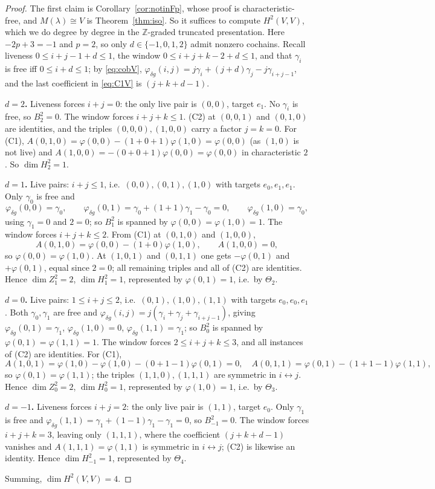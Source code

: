 \documentclass[10pt,a4paper]{amsart}
\newcommand{\Bt}{B^2}
\newcommand{\Ht}{H^2}
\newcommand{\Zt}{Z^2}
\begin{document}
\begin{proof}
The first claim is Corollary~\ref{cor:notinFp}, whose proof is characteristic-free, and
$M(\lambda)\cong V$ is Theorem~\ref{thm:iso}. So it suffices to compute $\Ht(V,V)$, which we
do degree by degree in the $\mathbb{Z}$-graded truncated presentation. Here
$-2p+3=-1$ and $p=2$, so only $d\in\{-1,0,1,2\}$ admit nonzero cochains. Recall liveness
$0\le i+j-1+d\le1$, the window $0\le i+j+k-2+d\le1$, and that $\gamma_i$ is free iff
$0\le i+d\le1$; by \eqref{eq:cobV},
$\varphi_{\delta g}(i,j)=j\gamma_i+(j+d)\gamma_j-j\gamma_{i+j-1}$, and the last coefficient
in \eqref{eq:C1V} is $(j+k+d-1)$.

\textbf{$d=2$.} Liveness forces $i+j=0$: the only live pair is $(0,0)$, target $e_1$. No
$\gamma_i$ is free, so $\Bt_2=0$. The window forces $i+j+k\le1$. (C2) at $(0,0,1)$ and
$(0,1,0)$ are identities, and the triples $(0,0,0),(1,0,0)$ carry a factor $j=k=0$. For
(C1), $A(0,1,0)=\varphi(0,0)-(1+0+1)\varphi(1,0)=\varphi(0,0)$ (as $(1,0)$ is not live) and
$A(1,0,0)=-(0+0+1)\varphi(0,0)=\varphi(0,0)$ in characteristic $2$. So $\dim\Ht_2=1$.

\textbf{$d=1$.} Live pairs: $i+j\le1$, i.e.\ $(0,0),(0,1),(1,0)$ with targets $e_0,e_1,e_1$.
Only $\gamma_0$ is free and
\[
\varphi_{\delta g}(0,0)=\gamma_0,\qquad
\varphi_{\delta g}(0,1)=\gamma_0+(1+1)\gamma_1-\gamma_0=0,\qquad
\varphi_{\delta g}(1,0)=\gamma_0,
\]
using $\gamma_1=0$ and $2=0$; so $\Bt_1$ is spanned by $\varphi(0,0)=\varphi(1,0)=1$. The
window forces $i+j+k\le2$. From (C1) at $(0,1,0)$ and $(1,0,0)$,
\[
A(0,1,0)=\varphi(0,0)-(1+0)\varphi(1,0),\qquad A(1,0,0)=0,
\]
so $\varphi(0,0)=\varphi(1,0)$. At $(1,0,1)$ and $(0,1,1)$ one gets $-\varphi(0,1)$ and
$+\varphi(0,1)$, equal since $2=0$; all remaining triples and all of (C2) are identities.
Hence $\dim\Zt_1=2$, $\dim\Ht_1=1$, represented by $\varphi(0,1)=1$, i.e.\ by $\Theta_2$.

\textbf{$d=0$.} Live pairs: $1\le i+j\le2$, i.e.\ $(0,1),(1,0),(1,1)$ with targets
$e_0,e_0,e_1$. Both $\gamma_0,\gamma_1$ are free and
$\varphi_{\delta g}(i,j)=j(\gamma_i+\gamma_j+\gamma_{i+j-1})$, giving
$\varphi_{\delta g}(0,1)=\gamma_1$, $\varphi_{\delta g}(1,0)=0$,
$\varphi_{\delta g}(1,1)=\gamma_1$; so $\Bt_0$ is spanned by
$\varphi(0,1)=\varphi(1,1)=1$. The window forces $2\le i+j+k\le3$, and all instances of (C2)
are identities. For (C1),
\[
A(1,0,1)=\varphi(1,0)-\varphi(1,0)-(0+1-1)\varphi(0,1)=0,\quad
A(0,1,1)=\varphi(0,1)-(1+1-1)\varphi(1,1),
\]
so $\varphi(0,1)=\varphi(1,1)$; the triples $(1,1,0),(1,1,1)$ are symmetric in
$i\leftrightarrow j$. Hence $\dim\Zt_0=2$, $\dim\Ht_0=1$, represented by
$\varphi(1,0)=1$, i.e.\ by $\Theta_3$.

\textbf{$d=-1$.} Liveness forces $i+j=2$: the only live pair is $(1,1)$, target $e_0$. Only
$\gamma_1$ is free and
$\varphi_{\delta g}(1,1)=\gamma_1+(1-1)\gamma_1-\gamma_1=0$, so $\Bt_{-1}=0$. The window
forces $i+j+k=3$, leaving only $(1,1,1)$, where the coefficient $(j+k+d-1)$ vanishes and
$A(1,1,1)=\varphi(1,1)$ is symmetric in $i\leftrightarrow j$; (C2) is likewise an identity.
Hence $\dim\Ht_{-1}=1$, represented by $\Theta_4$.

Summing, $\dim\Ht(V,V)=4$.
\end{proof}
\end{document}
